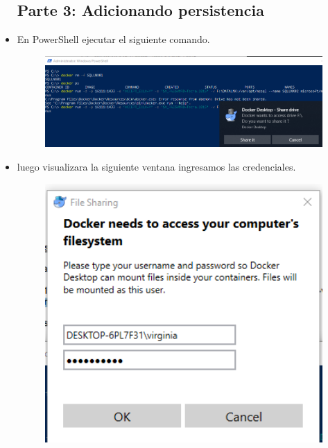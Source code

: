 \begin{itemize}
\subsection{Parte 3: Adicionando persistencia}
	\item En PowerShell ejecutar el siguiente comando.
                     \begin{figure}[H]
		\begin{center}
		\includegraphics[width=15cm]{./Imagenes/12}
		\end{center}
		\end{figure}   
          \item luego visualizara la siguiente ventana  ingresamos las credenciales.
                     \begin{figure}[H]
		\begin{center}
		\includegraphics[width=15cm]{./Imagenes/13}
		\end{center}
		\end{figure}   

\end{itemize}
